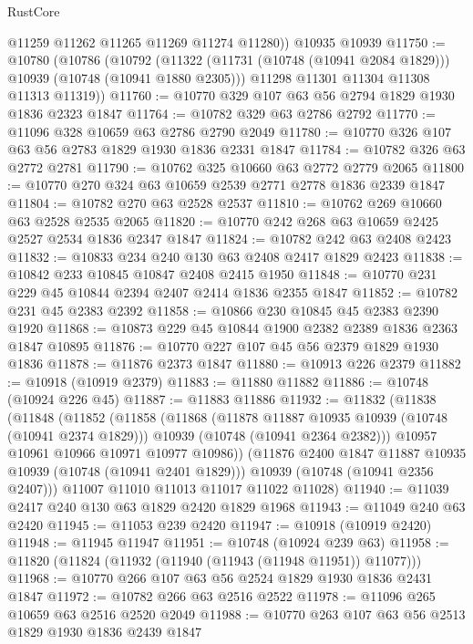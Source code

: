 \begin{lexlean}{RustCore}
\begin{coremodule}
        @11259
        @11262
        @11265
        @11269
        @11274
        @11280))
    @10935
    @10939
@11750 := @10780
    (@10786
      (@10792
        (@11322 (@11731 (@10748 (@10941 @2084 @1829))) @10939 (@10748 (@10941 @1880 @2305)))
        @11298
        @11301
        @11304
        @11308
        @11313
        @11319))
@11760 := @10770 @329 @107 @63 @56 @2794 @1829 @1930 @1836 @2323 @1847
@11764 := @10782 @329 @63 @2786 @2792
@11770 := @11096 @328 @10659 @63 @2786 @2790 @2049
@11780 := @10770 @326 @107 @63 @56 @2783 @1829 @1930 @1836 @2331 @1847
@11784 := @10782 @326 @63 @2772 @2781
@11790 := @10762 @325 @10660 @63 @2772 @2779 @2065
@11800 := @10770 @270 @324 @63 @10659 @2539 @2771 @2778 @1836 @2339 @1847
@11804 := @10782 @270 @63 @2528 @2537
@11810 := @10762 @269 @10660 @63 @2528 @2535 @2065
@11820 := @10770 @242 @268 @63 @10659 @2425 @2527 @2534 @1836 @2347 @1847
@11824 := @10782 @242 @63 @2408 @2423
@11832 := @10833 @234 @240 @130 @63 @2408 @2417 @1829 @2423
@11838 := @10842 @233 @10845 @10847 @2408 @2415 @1950
@11848 := @10770 @231 @229 @45 @10844 @2394 @2407 @2414 @1836 @2355 @1847
@11852 := @10782 @231 @45 @2383 @2392
@11858 := @10866 @230 @10845 @45 @2383 @2390 @1920
@11868 := @10873 @229 @45 @10844 @1900 @2382 @2389 @1836 @2363 @1847 @10895
@11876 := @10770 @227 @107 @45 @56 @2379 @1829 @1930 @1836
@11878 := @11876 @2373 @1847
@11880 := @10913 @226 @2379
@11882 := @10918 (@10919 @2379)
@11883 := @11880 @11882
@11886 := @10748 (@10924 @226 @45)
@11887 := @11883 @11886
@11932 := @11832
    (@11838
      (@11848
        (@11852
          (@11858
            (@11868
              (@11878 @11887 @10935 @10939 (@10748 (@10941 @2374 @1829)))
              @10939
              (@10748 (@10941 @2364 @2382)))
            @10957
            @10961
            @10966
            @10971
            @10977
            @10986))
        (@11876 @2400 @1847 @11887 @10935 @10939 (@10748 (@10941 @2401 @1829)))
        @10939
        (@10748 (@10941 @2356 @2407)))
      @11007
      @11010
      @11013
      @11017
      @11022
      @11028)
@11940 := @11039 @2417 @240 @130 @63 @1829 @2420 @1829 @1968
@11943 := @11049 @240 @63 @2420
@11945 := @11053 @239 @2420
@11947 := @10918 (@10919 @2420)
@11948 := @11945 @11947
@11951 := @10748 (@10924 @239 @63)
@11958 := @11820 (@11824 (@11932 (@11940 (@11943 (@11948 @11951)) @11077)))
@11968 := @10770 @266 @107 @63 @56 @2524 @1829 @1930 @1836 @2431 @1847
@11972 := @10782 @266 @63 @2516 @2522
@11978 := @11096 @265 @10659 @63 @2516 @2520 @2049
@11988 := @10770 @263 @107 @63 @56 @2513 @1829 @1930 @1836 @2439 @1847

\end{coremodule}
\end{lexlean}
